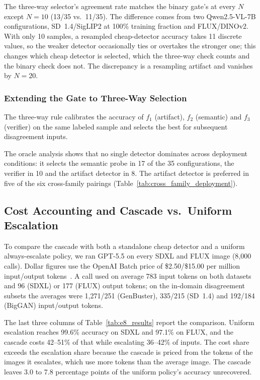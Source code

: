 \documentclass{ieeeaccess}
\begin{document}
The three-way selector's agreement rate matches the binary gate's at every $N$ except $N=10$ (13/35 vs.\ 11/35). The difference comes from two Qwen2.5-VL-7B configurations, SD~1.4/SigLIP2 at 100\% training fraction and FLUX/DINOv2. With only 10 samples, a resampled cheap-detector accuracy takes 11 discrete values, so the weaker detector occasionally ties or overtakes the stronger one; this changes which cheap detector is selected, which the three-way check counts and the binary check does not. The discrepancy is a resampling artifact and vanishes by $N{=}20$.

\subsubsection{Extending the Gate to Three-Way Selection}
\label{sec:threeway}

The three-way rule calibrates the accuracy of $f_1$ (artifact), $f_2$ (semantic) and $f_3$ (verifier) on the same labeled sample and selects the best for subsequent disagreement inputs.

The oracle analysis shows that no single detector dominates across
deployment conditions: it selects the semantic probe in 17 of the 35 configurations, the
verifier in 10 and the artifact detector in 8. The artifact detector is preferred in five of the six cross-family pairings (Table~\ref{tab:cross_family_deployment}). 

\subsection{Cost Accounting and Cascade vs.\ Uniform Escalation}
\label{sec:cost_accounting}

To compare the cascade with both a standalone cheap detector and a uniform always-escalate policy, we ran GPT-5.5 on every SDXL and FLUX image (8{,}000 calls). Dollar figures use the OpenAI Batch price of \$2.50/\$15.00 per million input/output tokens~\cite{openai_pricing}. A call used on average 783 input tokens on both datasets and 96 (SDXL) or 177 (FLUX) output tokens; on the in-domain disagreement subsets the averages were 1{,}271/251 (GenBuster), 335/215 (SD~1.4) and 192/184 (BigGAN) input/output tokens.

The last three columns of Table~\ref{tab:e8_results} report the comparison. Uniform escalation reaches 99.6\% accuracy on SDXL and 97.1\% on FLUX, and the cascade costs 42--51\% of that while escalating 36--42\% of inputs. The cost share exceeds the escalation share because the cascade is priced from the tokens of the images it escalates, which use more tokens than the average image. The cascade leaves 3.0 to 7.8 percentage points of the uniform policy's accuracy unrecovered.
\end{document}
